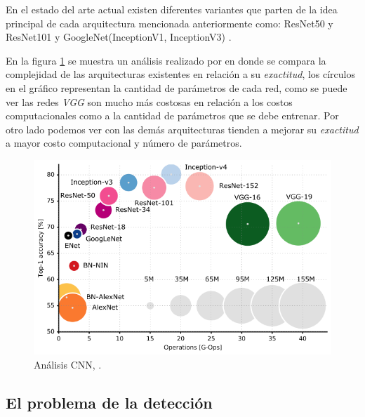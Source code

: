 En el estado del arte actual existen diferentes variantes que parten de la idea principal de cada arquitectura mencionada anteriormente como: ResNet50 y ResNet101 \citep{resnet_a} y GoogleNet(InceptionV1, InceptionV3) \citep{googlenet} . 

En la  figura \ref{Fig:cnn-analisis} se muestra un análisis realizado por \cite{Analysis_deep_network} en donde se compara la complejidad de las arquitecturas existentes en relación a su \textit{exactitud}, los círculos en el gráfico representan la cantidad de parámetros de cada red, como se puede ver las redes \textit{VGG} son mucho más costosas en relación a los costos computacionales como a la cantidad de parámetros que se debe entrenar. Por otro lado podemos ver con las demás arquitecturas tienden a mejorar su \textit{exactitud} a mayor costo computacional y número de parámetros.

\begin{figure}[H]
 \centering
  \includegraphics[scale=0.5,keepaspectratio=true,clip=true]{imagenes/MarcoTeorico/cnn-analisis.png}
  \caption{Análisis CNN, \citep{cazani_grap}.}\label{Fig:cnn-analisis}
\end{figure}



\subsection{El problema de la detección}\label{sub:problema_deteccion}


